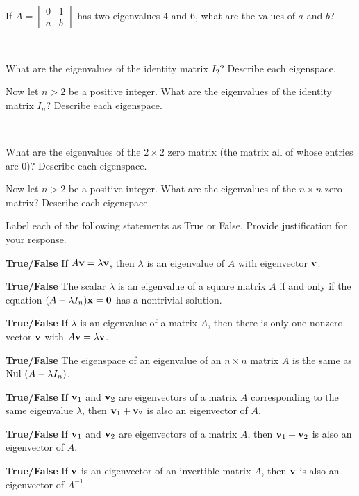 \item If $A=\left[ \begin{array}{cc} 0&1\\a&b \end{array} \right]$ has two eigenvalues 4 and 6, what are the values of $a$ and $b$?

\item ~
	\ba
	\item What are the eigenvalues of the identity matrix $I_2$? Describe each eigenspace.
	\item Now let $n > 2$ be a positive integer. What are the eigenvalues of the identity matrix $I_n$? Describe each eigenspace.
	\ea

\item ~
	\ba
	\item What are the eigenvalues of the $2 \times 2$ zero matrix (the matrix all of whose entries are 0)? Describe each eigenspace.
	\item Now let $n > 2$ be a positive integer. What are the eigenvalues of the $n \times n$ zero matrix? Describe each eigenspace.
	\ea
	
	

\item Label each of the following statements as True or False. Provide justification for your response.
	\ba
	\item \textbf{True/False} If $A\mathbf{v} = \lambda \mathbf{v}$, then $\lambda$ is an eigenvalue of $A$ with eigenvector $\mathbf{v}$.
	\item \textbf{True/False} The scalar $\lambda$ is an eigenvalue of a square matrix $A$ if and only if the equation $(A - \lambda I_n) \mathbf{x} = \mathbf{0}$ has a nontrivial solution. 
	\item \textbf{True/False} If $\lambda$ is an eigenvalue of a matrix $A$, then there is only one nonzero vector $\mathbf{v}$ with $A \mathbf{v} = \lambda \mathbf{v}$.  
	\item \textbf{True/False} The eigenspace of an eigenvalue of an $n \times n$ matrix $A$ is the same as $\text{Nul } (A - \lambda I_n)$. 
	\item \textbf{True/False} If $\mathbf{v}_1$ and $\mathbf{v}_2$ are eigenvectors of a matrix $A$ corresponding to the same eigenvalue $\lambda$, then $\mathbf{v}_1 + \mathbf{v}_2$ is also an eigenvector of $A$.	
	\item \textbf{True/False} If $\mathbf{v}_1$ and $\mathbf{v}_2$ are eigenvectors of a matrix $A$, then $\mathbf{v}_1 + \mathbf{v}_2$ is also an eigenvector of $A$. 
	\item \textbf{True/False} If $\mathbf{v}$ is an eigenvector of an invertible matrix $A$, then $\mathbf{v}$ is also an eigenvector of $A^{-1}$.
	\ea
	
